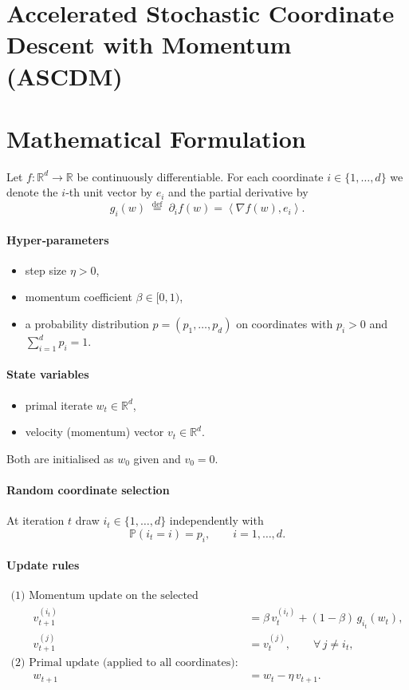 \documentclass{article}
\newcommand{\R}{\mathbb{R}}
\newcommand{\ip}[2]{\left\langle #1,#2\right\rangle}
\newcommand{\Prob}{\mathbb{P}}
\begin{document}
\section*{Accelerated Stochastic Coordinate Descent with Momentum (ASCDM)}

\section*{Mathematical Formulation}
Let $f:\R^{d}\to\R$ be continuously differentiable.  
For each coordinate $i\in\{1,\dots,d\}$ we denote the $i$‑th unit vector by $e_i$ and the partial derivative by
\[
g_i(w)\;\stackrel{\text{def}}{=}\;\partial_i f(w)=\ip{\nabla f(w)}{e_i}.
\]

\paragraph{Hyper‑parameters}
\begin{itemize}[noitemsep]
\item step size $\eta>0$,
\item momentum coefficient $\beta\in[0,1)$,
\item a probability distribution $p=(p_1,\dots,p_d)$ on coordinates with $p_i>0$ and $\sum_{i=1}^{d}p_i=1$.
\end{itemize}

\paragraph{State variables}
\begin{itemize}[noitemsep]
\item primal iterate $w_t\in\R^{d}$,
\item velocity (momentum) vector $v_t\in\R^{d}$.
\end{itemize}
Both are initialised as $w_0$ given and $v_0=0$.

\paragraph{Random coordinate selection}
At iteration $t$ draw $i_t\in\{1,\dots,d\}$ independently with
\[
\Prob(i_t=i)=p_i,\qquad i=1,\dots,d .
\]

\paragraph{Update rules}
\[
\begin{aligned}
\text{(1) Momentum update on the selected coordinate:}&\\
\qquad v_{t+1}^{(i_t)} &= \beta\, v_{t}^{(i_t)} + (1-\beta)\, g_{i_t}(w_t),\\
\qquad v_{t+1}^{(j)}   &= v_{t}^{(j)},\qquad\forall\,j\neq i_t,\\[4pt]
\text{(2) Primal update (applied to all coordinates):}&\\
\qquad w_{t+1} &= w_{t} - \eta\, v_{t+1}.
\end{aligned}
\tag{ASCDM}
\]
\end{document}
